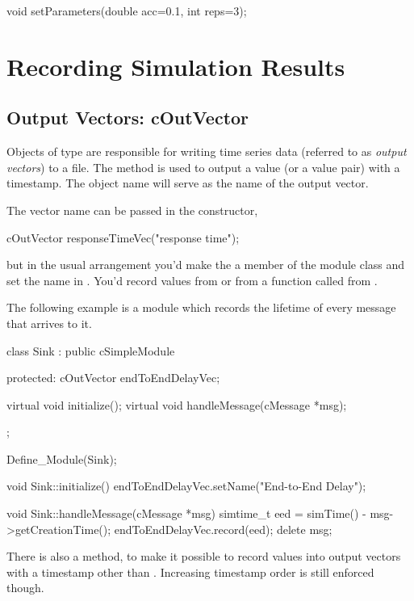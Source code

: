 \begin{cpp}
void setParameters(double acc=0.1, int reps=3);
\end{cpp}




\section{Recording Simulation Results}
\label{sec:ch-sim-lib:result-recording}

\subsection{Output Vectors: cOutVector}
\label{sec:ch-sim-lib:coutvector}

Objects of type  are responsible for writing time series
data (referred to as \textit{output vectors}) to a file. The 
method is used to output a value (or a value pair) with a timestamp.
The object name will serve as the name of the output vector.

The vector name can be passed in the constructor,

\begin{cpp}
cOutVector responseTimeVec("response time");
\end{cpp}

but in the usual arrangement you'd make the  a member
of the module class and set the name in . You'd
record values from  or from a function called from
.

The following example is a  module which records the lifetime
of every message that arrives to it.

\begin{cpp}
class Sink : public cSimpleModule
{
  protected:
    cOutVector endToEndDelayVec;

    virtual void initialize();
    virtual void handleMessage(cMessage *msg);
};

Define_Module(Sink);

void Sink::initialize()
{
    endToEndDelayVec.setName("End-to-End Delay");
}

void Sink::handleMessage(cMessage *msg)
{
    simtime_t eed = simTime() - msg->getCreationTime();
    endToEndDelayVec.record(eed);
    delete msg;
}
\end{cpp}

There is also a  method, to make it
possible to record values into output vectors with a timestamp other than
. Increasing timestamp order is still enforced though.

